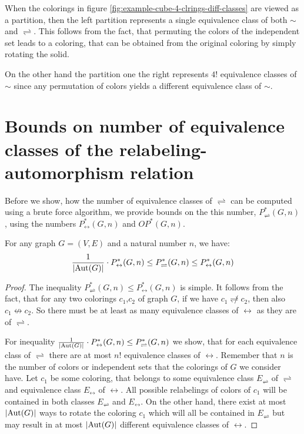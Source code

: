 \begin{highlight}
When the colorings in figure \ref{fig:example-cube-4-clrings-diff-classes} are viewed as a partition, then the left partition represents a single equivalence class of both $\sim$ and $\rightleftharpoons$. This follows from the fact, that permuting the colors of the independent set leads to a coloring, that can be obtained from the original coloring by simply rotating the solid.

On the other hand the partition one the right represents $4!$ equivalence classes of $\sim$ since any permutation of colors yields a different equivalence class of $\sim$.

\section{Bounds on number of equivalence classes of the relabeling-automorphism relation}

Before we show, how the number of equivalence classes of $\rightleftharpoons$ can be computed using a brute force algorithm, we provide bounds on the this number, $P^*_\rightleftharpoons(G,n)$, using the numbers $P^*_\leftrightarrow(G,n)$ and $OP^*(G,n)$.

\begin{claim}\label{clm:relabeling-bound}
    For any graph $G=(V,E)$ and a natural number $n$, we have: $$\frac{1}{\left|{\operatorname{Aut}(G)}\right|} \cdot P^*_\leftrightarrow(G,n) \leq P^*_\rightleftharpoons(G,n) \leq P^*_\leftrightarrow(G,n)$$ 
\end{claim}

\begin{proof}

The inequality $P^*_\rightleftharpoons(G,n) \leq P^*_\leftrightarrow(G,n)$ is simple. It follows from the fact, that for any two colorings $c_1$,$c_2$ of graph $G$, if we have $c_1 \not\rightleftharpoons c_2$, then also $c_1 \not\leftrightarrow c_2$. So there must be at least as many equivalence classes of $\leftrightarrow$ as they are of $\rightleftharpoons$.

For inequality $\frac{1}{\left|{\operatorname{Aut}(G)}\right|} \cdot P^*_\leftrightarrow(G,n) \leq P^*_\rightleftharpoons(G,n)$ we show, that for each equivalence class of $\rightleftharpoons$ there are at most $n!$ equivalence classes of $\leftrightarrow$. Remember that $n$ is the number of colors or independent sets that the colorings of $G$ we consider have. Let $c_1$ be some coloring, that belongs to some equivalence class $E_\rightleftharpoons$ of $\rightleftharpoons$ and equivalence class $E_\leftrightarrow$ of $\leftrightarrow$. All possible relabelings of colors of $c_1$ will be contained in both classes $E_\rightleftharpoons$ and $E_\leftrightarrow$. On the other hand, there exist at most $\left|{\operatorname{Aut}(G)}\right|$ ways to rotate the coloring $c_1$ which will all be contained in $E_\rightleftharpoons$ but may result in at most $\left|{\operatorname{Aut}(G)}\right|$ different equivalence classes of $\leftrightarrow$.


\end{proof}
\end{highlight}

